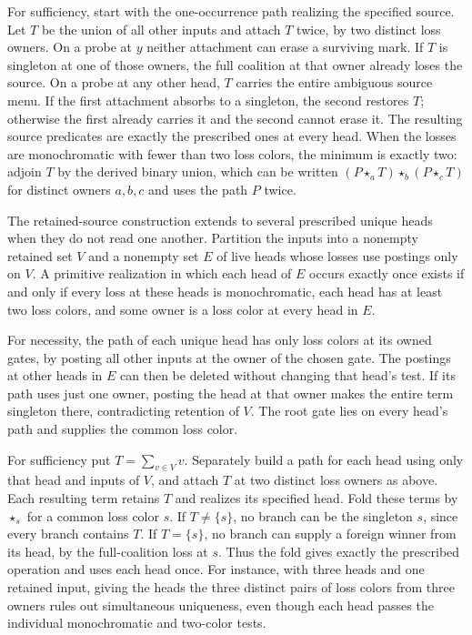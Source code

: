 For sufficiency, start with the one-occurrence path realizing
the specified source. Let $T$ be the union of all other inputs
and attach $T$ twice, by two distinct loss owners. On a probe at
$y$ neither attachment can erase a surviving mark. If $T$ is
singleton at one of those owners, the full coalition at that
owner already loses the source. On a probe at any other head,
$T$ carries the entire ambiguous source menu. If the first
attachment absorbs to a singleton, the second restores $T$;
otherwise the first already carries it and the second cannot
erase it. The resulting source predicates are exactly the
prescribed ones at every head. When the losses are monochromatic
with fewer than two loss colors, the minimum is exactly two:
adjoin $T$ by the derived binary union, which can be written
$(P\star_a T)\star_b(P\star_c T)$ for distinct owners $a,b,c$
and uses the path $P$ twice.

The retained-source construction extends to several prescribed
unique heads when they do not read one another. Partition the
inputs into a nonempty retained set $V$ and a nonempty set $E$
of live heads whose losses use postings only on $V$. A primitive
realization in which each head of $E$ occurs exactly once exists
if and only if every loss at these heads is monochromatic, each
head has at least two loss colors, and some owner is a loss
color at every head in $E$.

For necessity, the path of each unique head has only loss colors
at its owned gates, by posting all other inputs at the owner of
the chosen gate. The postings at other heads in $E$ can then be
deleted without changing that head's test. If its path uses just
one owner, posting the head at that owner makes the entire term
singleton there, contradicting retention of $V$. The root gate
lies on every head's path and supplies the common loss color.

For sufficiency put $T=\sum_{v\in V}v$. Separately build a path
for each head using only that head and inputs of $V$, and attach
$T$ at two distinct loss owners as above. Each resulting term
retains $T$ and realizes its specified head. Fold these terms
by $\star_s$ for a common loss color $s$. If $T\ne\{s\}$, no
branch can be the singleton $s$, since every branch contains
$T$. If $T=\{s\}$, no branch can supply a foreign winner from
its head, by the full-coalition loss at $s$. Thus the fold gives
exactly the prescribed operation and uses each head once.
For instance, with three heads and one retained input, giving
the heads the three distinct pairs of loss colors from three
owners rules out simultaneous uniqueness, even though each
head passes the individual monochromatic and two-color tests.

